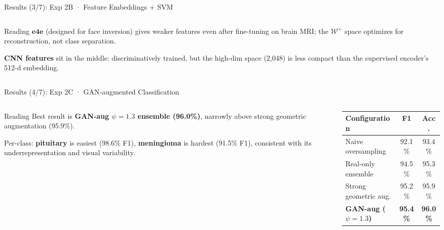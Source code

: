 \documentclass[aspectratio=169]{beamer}
\begin{document}
\begin{frame}{Results (3/7): Exp 2B · Feature Embeddings + SVM}
\begin{columns}
\begin{column}{0.43\textwidth}
\begin{block}{Reading}
        \vspace{0.4em}
        $\textbf{e4e}$ (designed for face inversion) gives weaker features
        even after fine-tuning on brain MRI; the $\mathcal{W}^+$ space
        optimizes for reconstruction, not class separation.

        \vspace{0.4em}
        \textbf{CNN features} sit in the middle: discriminatively trained,
        but the high-dim space (2{,}048) is less compact than the supervised
        encoder's 512-d embedding.
      \end{block}
    \end{column}
  \end{columns}
\end{frame}

\begin{frame}{Results (4/7): Exp 2C · GAN-augmented Classification}
  \begin{columns}
    \begin{column}{0.43\textwidth}
      \begin{block}{Reading}
        \footnotesize
        Best result is \textbf{GAN-aug $\psi{=}1.3$ ensemble (96.0\%)},
        narrowly above strong geometric augmentation (95.9\%).

        \vspace{0.4em}
        Per-class: \textbf{pituitary} is easiest (98.6\% F1),
        \textbf{meningioma} is hardest (91.5\% F1), consistent with its
        underrepresentation and visual variability.
      \end{block}
    \end{column}
    \begin{column}{0.55\textwidth}
      \begin{center}
      \scriptsize
      \begin{tabular*}{0.95\linewidth}{@{\extracolsep{\fill}}lcc}
        \toprule
        Configuration & F1 & Acc. \\
        \midrule
        Naive oversampling                      & 92.1\% & 93.4\% \\
        Real-only ensemble                      & 94.5\% & 95.3\% \\
        Strong geometric aug.                   & 95.2\% & 95.9\% \\
        \textbf{GAN-aug ($\psi{=}1.3$)}         & \textbf{95.4\%} & \textbf{96.0\%} \\
        \bottomrule
      \end{tabular*}
      \end{center}


\end{column}
\end{columns}
\end{frame}
\end{document}
